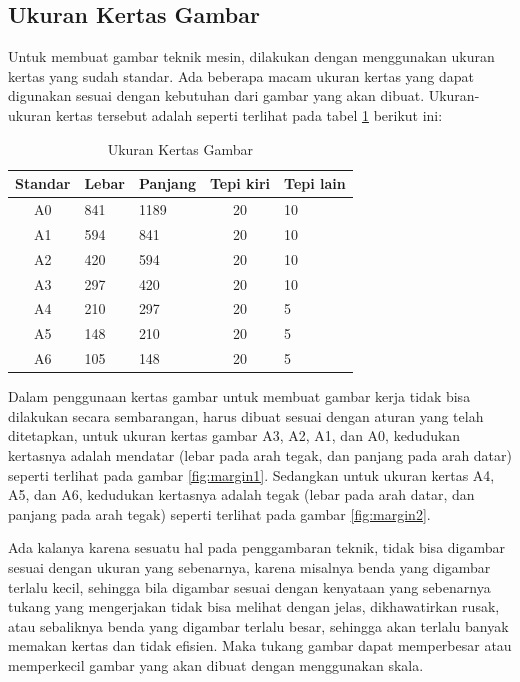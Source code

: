 \documentclass[../menggambarteknik.tex]{subfiles}
\begin{document}
\subsection{Ukuran Kertas Gambar}%
\label{sub:Ukuran Kertas Gambar}

Untuk membuat gambar teknik mesin, dilakukan dengan menggunakan ukuran kertas yang sudah standar. Ada beberapa macam ukuran kertas yang dapat digunakan sesuai dengan kebutuhan dari gambar yang akan dibuat. Ukuran- ukuran kertas tersebut adalah seperti terlihat pada tabel \ref{tab:tab1} berikut ini:

\begin{table}[htb]
	\caption{Ukuran Kertas Gambar}
	\label{tab:tab1}
	\begin{tabularx}{.75\textwidth}{c X X c X}
		\hline
		Standar  &  Lebar  &  Panjang  &  Tepi kiri  &  Tepi lain  \\
		\hline
		A0       &  841    &  1189     &  20         &  10  \\
		A1       &  594    &  841      &  20         &  10  \\
		A2       &  420    &  594      &  20         &  10  \\
		A3       &  297    &  420      &  20         &  10  \\
		A4       &  210    &  297      &  20         &  5  \\
		A5       &  148    &  210      &  20         &  5  \\
		A6       &  105    &  148      &  20         &  5  \\
		\hline
	\end{tabularx}
\end{table}


Dalam penggunaan kertas gambar untuk membuat gambar kerja tidak bisa dilakukan secara sembarangan, harus dibuat sesuai dengan aturan yang telah ditetapkan, untuk ukuran kertas gambar A3, A2, A1, dan A0, kedudukan kertasnya adalah mendatar (lebar pada arah tegak, dan panjang pada arah datar) seperti terlihat pada gambar \ref{fig:margin1}. Sedangkan untuk ukuran kertas A4, A5, dan A6, kedudukan kertasnya adalah tegak (lebar pada arah datar, dan panjang pada arah tegak) seperti terlihat pada gambar \ref{fig:margin2}.

Ada kalanya karena sesuatu hal pada penggambaran teknik, tidak bisa digambar sesuai dengan ukuran yang sebenarnya, karena misalnya benda yang digambar terlalu kecil, sehingga bila digambar sesuai dengan kenyataan yang sebenarnya tukang yang mengerjakan tidak bisa melihat dengan jelas, dikhawatirkan rusak, atau sebaliknya benda yang digambar terlalu besar, sehingga akan terlalu banyak memakan kertas dan tidak efisien. Maka tukang gambar dapat memperbesar atau memperkecil gambar yang akan dibuat dengan menggunakan skala.
\end{document}
